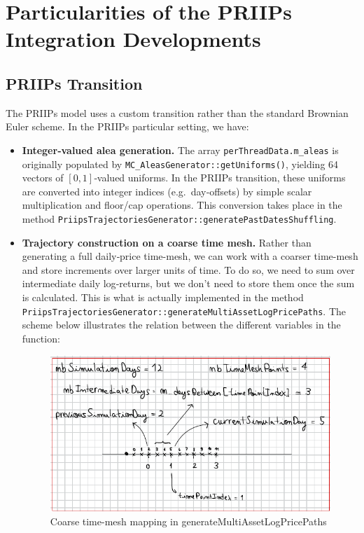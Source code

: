 \documentclass[11pt]{article}
\begin{document}
\section{Particularities of the PRIIPs Integration Developments}

\subsection{PRIIPs Transition}

The PRIIPs model uses a custom transition rather than the standard Brownian Euler scheme.  In the PRIIPs particular setting, we have:

\begin{itemize}
  \item \textbf{Integer‐valued alea generation.}  
    The array \texttt{perThreadData.m\_aleas} is originally populated by 
    \texttt{MC\_AleasGenerator::getUniforms()}, yielding 64 vectors of \([0,1]\)‐valued uniforms. In the PRIIPs transition, these uniforms are converted into integer indices (e.g.\ day‐offsets) by simple scalar multiplication and floor/cap operations. This conversion takes place in the method  \texttt{PriipsTrajectoriesGenerator::generatePastDatesShuffling}.

  \item \textbf{Trajectory construction on a coarse time mesh.}  
    Rather than generating a full daily‐price time-mesh, we can work with a coarser time-mesh and store increments over larger units of time. To do so, we need to sum
    over intermediate daily log‐returns, but we don't need to store them once the sum is calculated. This is what is actually implemented in the method \texttt{PriipsTrajectoriesGenerator::generateMultiAssetLogPricePaths}. The scheme below illustrates the relation between the different variables in the function:

     \begin{figure}[h]
      \centering
      \includegraphics[width=\textwidth]{PriipsTimeMeshScheme.png}
      \caption{Coarse time-mesh mapping in generateMultiAssetLogPricePaths}
\end{figure}
\end{itemize}
\end{document}
